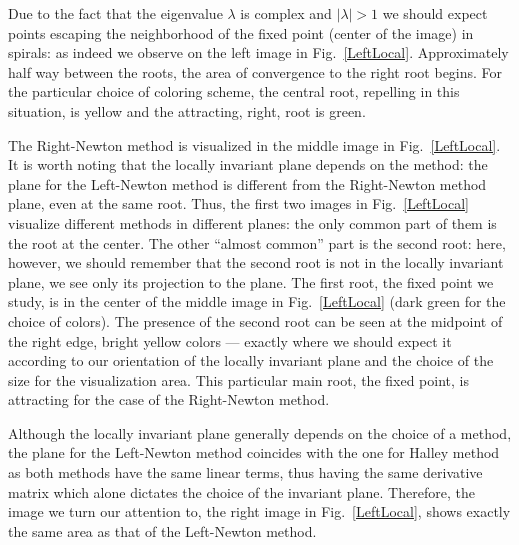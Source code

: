 \documentclass{article}
\theoremstyle{definition}
\begin{document}
Due to the fact that the eigenvalue $\lambda$ is complex and  $|\lambda|>1$ we should expect points escaping the neighborhood of the fixed point (center of the image) in spirals: as indeed we observe on the left image in Fig.~\ref{LeftLocal}. Approximately half way between the roots, the area of convergence to the right root begins. For the particular choice of coloring scheme, the central root, repelling in this situation, is yellow and the attracting, right, root is green.

The Right-Newton method is visualized in the middle image in Fig.~\ref{LeftLocal}. It is worth noting that the locally invariant plane depends on the method: the plane for the Left-Newton method is different from the Right-Newton method plane, even at the same root. Thus, the first two images in Fig.~\ref{LeftLocal}  visualize different methods in different planes: the only common part of them is the root at the center. The other ``almost common'' part is the second root: here, however, we should remember that the second root is not in the locally invariant plane, we see only its projection to the plane. The first root, the fixed point we study, is in the center of the middle image in Fig.~\ref{LeftLocal} (dark green for the choice of colors). The presence of the second root can be seen at the midpoint of the right edge, bright yellow colors --- exactly where we should expect it according to our orientation of the locally invariant plane and the choice of the size for the visualization area. This particular main root, the fixed point, is attracting for the case of the Right-Newton method.

Although the locally invariant plane generally depends on the choice of a method, the plane for the Left-Newton method coincides with the one for Halley method as both methods have the same linear terms, thus having the same derivative matrix which alone dictates the choice of the invariant plane. Therefore, the image we turn our attention to, the right image in Fig.~\ref{LeftLocal}, shows exactly the same area as that of the Left-Newton method.
\end{document}
